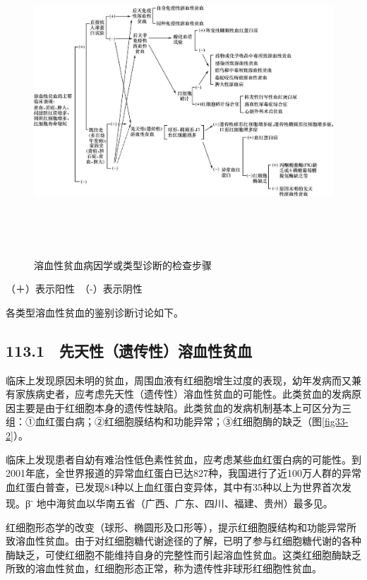 \begin{figure}[!htbp]
 \centering
 \includegraphics[width=7.25in,height=4.54167in]{./images/Image00169.jpg}
 \captionsetup{justification=centering}
 \caption{溶血性贫血病因学或类型诊断的检查步骤}
 \label{fig33-1}
  \end{figure} 

（＋）表示阳性　（-）表示阴性

各类型溶血性贫血的鉴别诊断讨论如下。

\protect\hypertarget{text00259.html}{}{}

\subsection{113.1　先天性（遗传性）溶血性贫血}

临床上发现原因未明的贫血，周围血液有红细胞增生过度的表现，幼年发病而又兼有家族病史者，应考虑先天性（遗传性）溶血性贫血的可能性。此类贫血的发病原因主要是由于红细胞本身的遗传性缺陷。此类贫血的发病机制基本上可区分为三组：①血红蛋白病；②红细胞膜结构和功能异常；③红细胞酶的缺乏（图\ref{fig33-2}）。

临床上发现患者自幼有难治性低色素性贫血，应考虑某些血红蛋白病的可能性。到2001年底，全世界报道的异常血红蛋白已达827种，我国进行了近100万人群的异常血红蛋白普查，已发现84种以上血红蛋白变异体，其中有35种以上为世界首次发现。β\textsuperscript{-}
地中海贫血以华南五省（广西、广东、四川、福建、贵州）最多见。

红细胞形态学的改变（球形、椭圆形及口形等），提示红细胞膜结构和功能异常所致溶血性贫血。由于对红细胞糖代谢途径的了解，已明了参与红细胞糖代谢的各种酶缺乏，可使红细胞不能维持自身的完整性而引起溶血性贫血。这类红细胞酶缺乏所致的溶血性贫血，红细胞形态正常，称为遗传性非球形红细胞性贫血。

